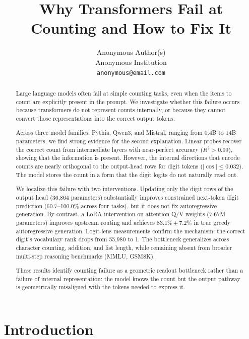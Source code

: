 \documentclass{article}
\title{Why Transformers Fail at Counting and How to Fix It}
\author{
  Anonymous Author(s) \\
  Anonymous Institution \\
  \texttt{anonymous@email.com}
}
\begin{document}
\maketitle

\begin{abstract}
Large language models often fail at simple counting tasks, even when the items
to count are explicitly present in the prompt. We investigate whether this
failure occurs because transformers do not represent counts internally, or
because they cannot convert those representations into the correct output tokens.

Across three model families: Pythia, Qwen3, and Mistral, ranging from 0.4B to
14B parameters, we find strong evidence for the second explanation. Linear
probes recover the correct count from intermediate layers with near-perfect
accuracy ($R^2>0.99$), showing that the information is present. However, the
internal directions that encode counts are nearly orthogonal to the output-head
rows for digit tokens ($|\cos| \leq 0.032$). The model stores the count in a
form that the digit logits do not naturally read out.

We localize this failure with two interventions. Updating only the digit rows
of the output head (36,864 parameters) substantially improves constrained
next-token digit prediction (60.7--100.0\% across four tasks), but it does not
fix autoregressive generation. By contrast, a LoRA intervention on attention
Q/V weights (7.67M parameters) improves upstream routing and achieves
83.1\%\,$\pm$\,7.2\% in true greedy autoregressive generation. Logit-lens
measurements confirm the mechanism: the correct digit's vocabulary rank drops
from 55,980 to 1. The bottleneck generalizes
across character counting, addition, and list length, while remaining absent
from broader multi-step reasoning benchmarks (MMLU, GSM8K).

These results identify counting failure as a geometric readout bottleneck rather
than a failure of internal representation: the model knows the count but the
output pathway is geometrically misaligned with the tokens needed to express it.
\end{abstract}

\section{Introduction}
\label{sec:introduction}
\end{document}
